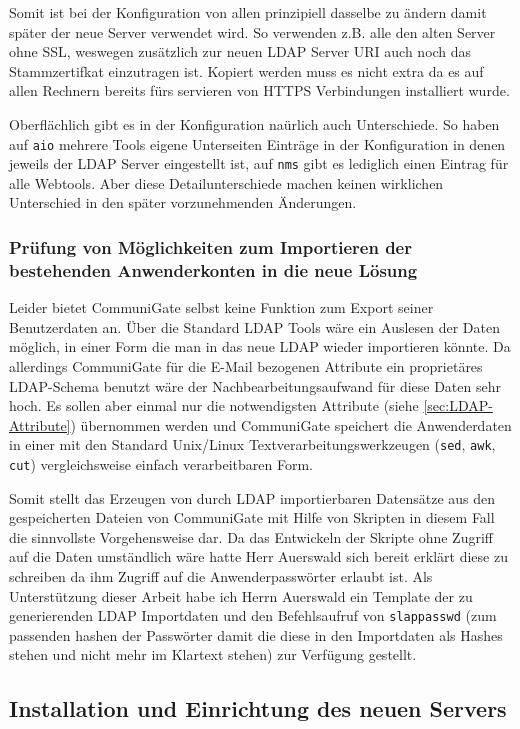 \documentclass[11pt,a4paper,titlepage=firstiscover]{scrartcl} %
\begin{document}
Somit ist bei der Konfiguration von allen prinzipiell dasselbe zu ändern damit später der neue Server verwendet wird. So verwenden z.B. alle den alten Server ohne SSL, weswegen zusätzlich zur neuen LDAP Server URI auch noch das Stammzertifkat einzutragen ist. Kopiert werden muss es nicht extra da es auf allen Rechnern bereits fürs servieren von HTTPS Verbindungen installiert wurde. 

Oberflächlich gibt es in der Konfiguration naürlich auch Unterschiede. So haben auf \texttt{aio} mehrere Tools eigene Unterseiten Einträge in der Konfiguration in denen jeweils der LDAP Server eingestellt ist, auf \texttt{nms} gibt es lediglich einen Eintrag für alle Webtools. Aber diese Detailunterschiede machen keinen wirklichen Unterschied in den später vorzunehmenden Änderungen.

\subsubsection{Prüfung von Möglichkeiten zum Importieren der bestehenden Anwenderkonten in die neue Lösung}\label{sec:Importsuche}
Leider bietet CommuniGate selbst keine Funktion zum Export seiner Benutzerdaten an. Über die Standard LDAP Tools wäre ein Auslesen der Daten möglich, in einer Form die man in das neue LDAP wieder importieren könnte. Da allerdings CommuniGate für die E-Mail bezogenen Attribute ein proprietäres LDAP-Schema benutzt wäre der Nachbearbeitungsaufwand für diese Daten sehr hoch. Es sollen aber einmal nur die notwendigsten Attribute (siehe \autoref{sec:LDAP-Attribute}) übernommen werden und CommuniGate speichert die Anwenderdaten in einer mit den Standard Unix/Linux Textverarbeitungswerkzeugen (\texttt{sed}, \texttt{awk}, \texttt{cut}) vergleichsweise einfach verarbeitbaren Form. 

Somit stellt das Erzeugen von durch LDAP importierbaren Datensätze aus den gespeicherten Dateien von CommuniGate mit Hilfe von Skripten in diesem Fall die sinnvollste Vorgehensweise dar. Da das Entwickeln der Skripte ohne Zugriff auf die Daten umständlich wäre hatte Herr Auerswald sich bereit erklärt diese zu schreiben da ihm Zugriff auf die Anwenderpasswörter erlaubt ist. Als Unterstützung dieser Arbeit habe ich Herrn Auerswald ein Template der zu generierenden LDAP Importdaten und den Befehlsaufruf von \texttt{slappasswd} (zum passenden hashen der Passwörter damit die diese in den Importdaten als Hashes stehen und nicht mehr im Klartext stehen) zur Verfügung gestellt.

\subsection{Installation und Einrichtung des neuen Servers}
\end{document}
